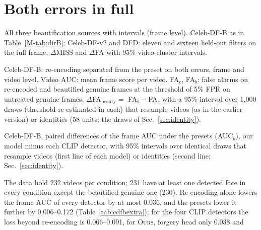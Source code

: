 \documentclass[10pt]{article}
\newcommand{\oursB}{\textsc{Ours}, forgery head only}
\begin{document}
\section{Both errors in full}
\label{sec:twosidedfull}
\begin{table}[H]
\centering
\caption{All three beautification sources with intervals (frame level). Celeb-DF-B as in Table~\ref{M-tab:dirB}; Celeb-DF-v2
and DFD: eleven and sixteen held-out filters on the full frame, $\Delta$MISS and $\Delta$FA with 95\% video-cluster intervals.}
\label{tab:twosidedfull}
\scriptsize
\begin{adjustbox}{max width=\linewidth}\end{adjustbox}
\end{table}
\begin{table}[H]
\centering
\caption{Celeb-DF-B: re-encoding separated from the preset on both errors, frame and video level. Video AUC: mean frame score per
video. FA$_c$, FA$_b$: false alarms on re-encoded and beautified genuine frames at the threshold of 5\% FPR on untreated genuine
frames; $\Delta$FA$_\text{beauty}=$ FA$_b-$FA$_c$ with a 95\% interval over 1,000 draws (threshold re-estimated in each) that
resample videos (as in the earlier version) or identities (58 units; the draws of Sec.~\ref{sec:identity}).}
\label{tab:cdfbextra}
\scriptsize
\begin{adjustbox}{max width=\linewidth}\end{adjustbox}
\end{table}
\begin{table}[H]
\centering
\caption{Celeb-DF-B, paired differences of the frame AUC under the presets (AUC$_b$), our model minus each CLIP detector, with
95\% intervals over identical draws that resample videos (first line of each model) or identities (second line; Sec.~\ref{sec:identity}).}
\label{tab:cdfbpaired}
\footnotesize
\begin{adjustbox}{max width=\linewidth}\end{adjustbox}
\end{table}
The data hold 232 videos per condition; 231 have at least one detected face in every condition except the beautified genuine one
(230). Re-encoding alone lowers the frame AUC of every detector by at most 0.036, and the presets lower it further by 0.006--0.172
(Table~\ref{tab:cdfbextra}); for the four CLIP detectors the loss beyond re-encoding is 0.066--0.091, for \oursB{} 0.038 and
\end{document}
